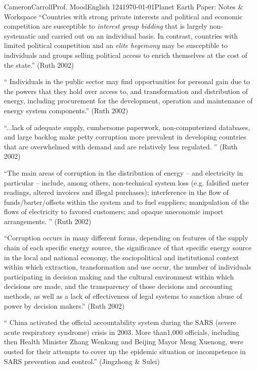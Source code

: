 \documentclass[12pt,letterpaper]{article}
\begin{document}
\begin{mla}{Cameron}{Carroll}{Prof. Mood}{English 124}{\today}{Planet Earth Paper: Notes \& Workspace}
``Countries with strong private interests and political and economic competition are susceptible to \emph{interest group bidding} that is largely non-systematic and carried out on an individual basis. In contrast, countries with limited political competition and an \emph{elite hegemony} may be susceptible to individuals and groups selling political access to enrich themselves at the cost of the state.'' (Ruth 2002)

`` Individuals in the public sector may find opportunities for personal gain due to the powers that they hold over access to, and transformation and distribution of energy, including procurement for the development, operation and maintenance of energy system components.'' (Ruth 2002)

``...lack of adequate supply, cumbersome paperwork, non-computerized databases, and large backlog make petty corruption more prevalent in developing countries that are overwhelmed with demand and are relatively less regulated. '' (Ruth 2002)

``The main areas of corruption in the distribution of energy – and electricity in particular – include, among others, non-technical system loss (e.g. falsified meter readings, altered invoices and illegal purchases); interference in the flow of funds/barter/offsets within the system and to fuel suppliers; manipulation of the flows of electricity to favored customers; and opaque uneconomic import arrangements. '' (Ruth 2002)

``Corruption occurs in many different forms, depending on features of the supply chain of each specific energy source, the significance of that specific energy source in the local and national economy, the sociopolitical and institutional context within which extraction, transformation and use occur, the number of individuals participating in decision making and the cultural environment within which decisions are made, and the transparency of those decisions and accounting methods, as well as a lack of effectiveness of legal systems to sanction abuse of power by decision makers.'' (Ruth 2002)




`` China activated the official accountability system during the SARS (severe acute respiratory syndrome) crisis in 2003. More than1,000 officials, including then Health Minister Zhang Wenkang and Beijing Mayor Meng Xuenong, were ousted for their attempts to cover up the epidemic situation or incompetence in SARS prevention and control.'' (Jingzhong \& Sulei)



\end{mla}
\end{document}
